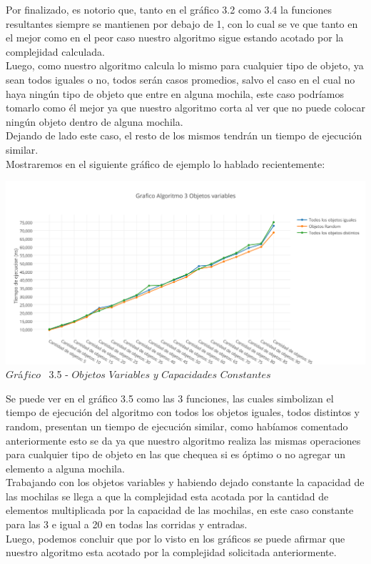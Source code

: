 Por finalizado, es notorio que, tanto en el gr\'afico 3.2 como 3.4 la funciones resultantes siempre se mantienen por debajo de 1, con lo cual se ve que tanto en el mejor como en el peor caso nuestro algoritmo sigue estando acotado por la complejidad calculada.\\

Luego, como nuestro algoritmo calcula lo mismo para cualquier tipo de objeto, ya sean todos iguales o no, todos ser\'an casos promedios, salvo el caso en el cual no haya ning\'un tipo de objeto que entre en alguna mochila, este caso podr\'iamos tomarlo como \'el mejor ya que nuestro algoritmo corta al ver que no puede colocar ning\'un objeto dentro de alguna mochila.\\
Dejando de lado este caso, el resto de los mismos tendr\'an un tiempo de ejecuci\'on similar.\\

Mostraremos en el siguiente gr\'afico de ejemplo lo hablado recientemente:\\

\vspace*{0.3cm} \vspace*{0.3cm}
  \begin{center}
 \includegraphics[scale=0.65]{./EJ3/objetos.png}
  {$Gr$\'a$fico$ \ 3.5 - $Objetos$ $Variables$ $y$ $Capacidades$ $Constantes$}
  \end{center}
  \vspace*{0.3cm}
  
Se puede ver en el gr\'afico 3.5 como las 3 funciones, las cuales simbolizan el tiempo de ejecuci\'on del algoritmo con todos los objetos iguales, todos distintos y random, presentan un tiempo de ejecuci\'on similar, como hab\'iamos comentado anteriormente esto se da ya que nuestro algoritmo realiza las mismas operaciones para cualquier tipo de objeto en las que chequea si es \'optimo o no agregar un elemento a alguna mochila.\\

Trabajando con los objetos variables y habiendo dejado constante la capacidad de las mochilas se llega a que la complejidad esta acotada por la cantidad de elementos multiplicada por la capacidad de las mochilas, en este caso constante para las 3 e igual a 20 en todas las corridas y entradas.\\

Luego, podemos concluir que por lo visto en los gr\'aficos se puede afirmar que nuestro algoritmo esta acotado por la complejidad solicitada anteriormente.\\